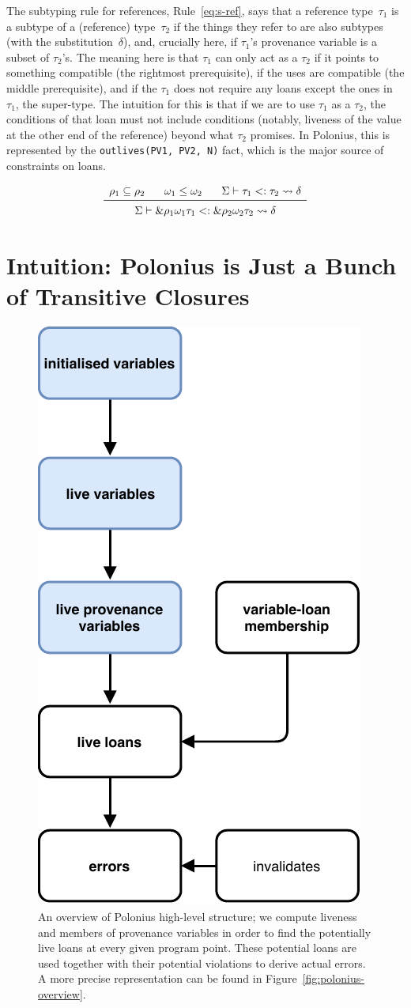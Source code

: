 \documentclass[11pt,a4paper,twoside,openany,draft]{report}
\newcommand{\InDatalog}[1]{\texttt{#1}}
\newcommand{\ntyperule}[2]{\begin{array}{c}#1\\\midrule\raisebox{1pt}{\strut}#2\end{array}}
\begin{document}
The subtyping rule for references, Rule~\eqref{eq:s-ref}, says that a reference
type~$\tau_1$ is a subtype of a (reference) type~$\tau_2$ if the things they
refer to are also subtypes (with the substitution~$\delta$), and, crucially
here, if $\tau_1$'s provenance variable is a subset of $\tau_2$'s. The meaning
here is that $\tau_1$ can only act as a $\tau_2$ if it points to something
compatible (the rightmost prerequisite), if the uses are compatible (the middle
prerequisite), and if the $\tau_1$ does not require any loans except the ones in
$\tau_1$, the super-type. The intuition for this is that if we are to use
$\tau_1$ as a $\tau_2$, the conditions of that loan must not include conditions
(notably, liveness of the value at the other end of the reference) beyond what
$\tau_2$ promises. In Polonius, this is represented by the
\InDatalog{outlives(PV1, PV2, N)} fact, which is the major source of constraints
on loans.

\begin{equation}\label{eq:s-ref}
  \ntyperule{
    \rho_1 \subseteq \rho_2 \:\:\:\:\:\:\:\:
    \omega_1 \leq \omega_2 \:\:\:\:\:\:\:\:
    \Sigma \vdash \tau_1 <: \tau_2 \leadsto \delta
  }
  {
    \Sigma \vdash \&\rho_1 \omega_1 \tau_1 <: \& \rho_2 \omega_2 \tau_2 \leadsto \delta
  }
\end{equation}

\section{Intuition: Polonius is Just a Bunch of Transitive
  Closures}\label{sec:borrow-check-intuition}


\begin{figure}[h!]
  \centering
  \includegraphics[width=0.4\linewidth]{Graphs/polonius-high-level-overview}
  \caption[Polonius High-Level Overview]{An overview of Polonius high-level
    structure; we compute liveness and members of provenance variables in order
    to find the potentially live loans at every given program point. These
    potential loans are used together with their potential violations to derive
    actual errors. A more precise representation can be found in
    Figure~\ref{fig:polonius-overview}.}\label{fig:polonius-high-level-overview}
\end{figure}
\end{document}
